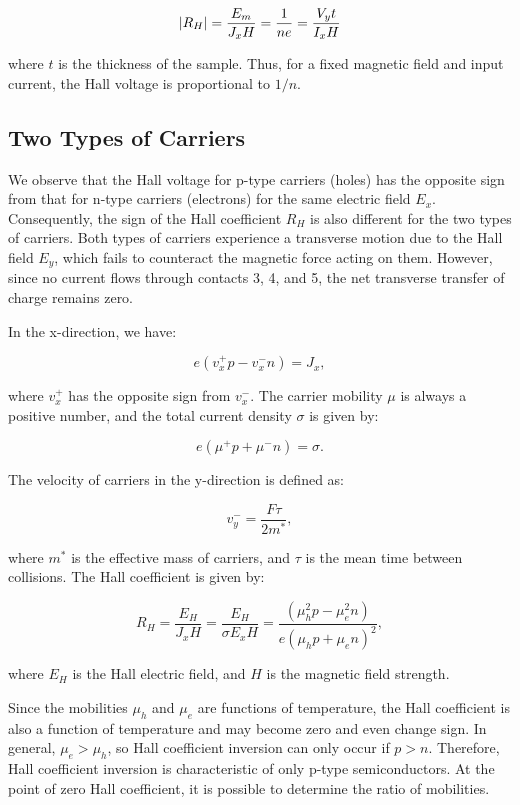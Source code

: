 		\begin{equation}
			\label{eq:1}
			\abs{R_H}=\frac{E_m}{J_xH}=\frac{1}{ne}=\frac{V_y t}{I_xH}
		\end{equation}

		where $t$ is the thickness of the sample. Thus, for a fixed magnetic field and input current, the Hall voltage is proportional to $1/n$.

	\subsection{Two Types of Carriers}
		We observe that the Hall voltage for p-type carriers (holes) has the opposite sign from that for n-type carriers (electrons) for the same electric field $E_x$. Consequently, the sign of the Hall coefficient $R_H$ is also different for the two types of carriers. Both types of carriers experience a transverse motion due to the Hall field $E_y$, which fails to counteract the magnetic force acting on them. However, since no current flows through contacts 3, 4, and 5, the net transverse transfer of charge remains zero.

		In the x-direction, we have:

		\begin{equation}
			e(v^+_xp-v^-_xn)=J_x,
			\label{eq:x_direction}
		\end{equation}

		where $v^+_x$ has the opposite sign from $v^-_x$. The carrier mobility $\mu$ is always a positive number, and the total current density $\sigma$ is given by:
		
		\begin{equation}
			e(\mu^+p+\mu^-n)=\sigma.
			\label{eq:total_current_density}
		\end{equation}

		The velocity of carriers in the y-direction is defined as:
		
		\begin{equation}
			v^-_y=\frac{F\tau}{2m^*},
			\label{eq:y_direction}
		\end{equation}

		where $m^*$ is the effective mass of carriers, and $\tau$ is the mean time between collisions. The Hall coefficient is given by:
		
		\begin{equation}
			R_H=\frac{E_H}{J_xH}=\frac{E_H}{\sigma E_xH}=\frac{(\mu^2_hp-\mu^2_en)}{e(\mu_hp+\mu_en)^2},
			\label{eq:hall_coefficient}
		\end{equation}

		where $E_H$ is the Hall electric field, and $H$ is the magnetic field strength.

		Since the mobilities $\mu_h$ and $\mu_e$ are functions of temperature, the Hall coefficient is also a function of temperature and may become zero and even change sign. In general, $\mu_e > \mu_h$, so Hall coefficient inversion can only occur if $p > n$. Therefore, Hall coefficient inversion is characteristic of only p-type semiconductors. At the point of zero Hall coefficient, it is possible to determine the ratio of mobilities.
